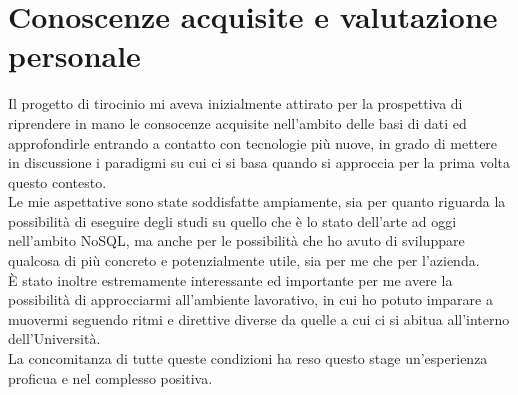 \section{Conoscenze acquisite e valutazione personale}
Il progetto di tirocinio mi aveva inizialmente attirato per la prospettiva di riprendere in mano le consocenze acquisite nell'ambito delle basi di dati ed approfondirle entrando a contatto con tecnologie più nuove, in grado di mettere in discussione i paradigmi su cui ci si basa quando si approccia per la prima volta questo contesto.\\

\noindent Le mie aspettative sono state soddisfatte ampiamente, sia per quanto riguarda la possibilità di eseguire degli studi su quello che è lo stato dell'arte ad oggi nell'ambito NoSQL, ma anche per le possibilità che ho avuto di sviluppare qualcosa di più concreto e potenzialmente utile, sia per me che per l'azienda.\\

\noindent È stato inoltre estremamente interessante ed importante per me avere la possibilità di approcciarmi all'ambiente lavorativo, in cui ho potuto imparare a muovermi seguendo ritmi e direttive diverse da quelle a cui ci si abitua all'interno dell'Università.\\

\noindent La concomitanza di tutte queste condizioni ha reso questo stage un'esperienza proficua e nel complesso positiva.\\